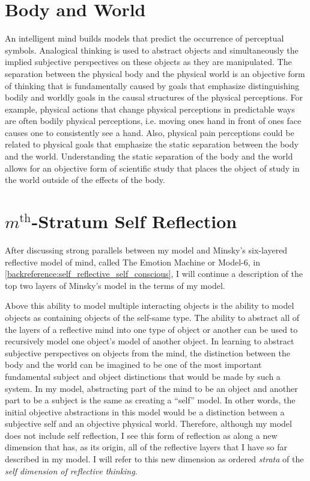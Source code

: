 \section{Body and World}

An intelligent mind builds models that predict the occurrence of
perceptual symbols.  Analogical thinking is used to abstract objects
and simultaneously the implied subjective perspectives on these
objects as they are manipulated.  The separation between the physical
body and the physical world is an objective form of thinking that is
fundamentally caused by goals that emphasize distinguishing bodily and
worldly goals in the causal structures of the physical perceptions.
For example, physical actions that change physical perceptions in
predictable ways are often bodily physical perceptions, i.e. moving
ones hand in front of ones face causes one to consistently see a hand.
Also, physical pain perceptions could be related to physical goals
that emphasize the static separation between the body and the world.
Understanding the static separation of the body and the world allows
for an objective form of scientific study that places the object of
study in the world outside of the effects of the body.

\section{$m^\text{th}$-Stratum Self Reflection}

\label{section:model_6_future_research}

After discussing strong parallels between my model and Minsky's
six-layered reflective model of mind, called The Emotion Machine or
Model-6, in \autoref{backreference:self_reflective_self_conscious}, I
will continue a description of the top two layers of Minsky's model in
the terms of my model.

Above this ability to model multiple interacting objects is the
ability to model objects as containing objects of the self-same type.
The ability to abstract all of the layers of a reflective mind into
one type of object or another can be used to recursively model one
object's model of another object.  In learning to abstract subjective
perspectives on objects from the mind, the distinction between the
body and the world can be imagined to be one of the most important
fundamental subject and object distinctions that would be made by such
a system.  In my model, abstracting part of the mind to be an object
and another part to be a subject is the same as creating a ``self''
model.  In other words, the initial objective abstractions in this
model would be a distinction between a subjective self and an
objective physical world.  Therefore, although my model does not
include self reflection, I see this form of reflection as along a new
dimension that has, as its origin, all of the reflective layers that I
have so far described in my model.  I will refer to this new dimension
as ordered \emph{strata} of the \emph{self dimension of reflective
  thinking}.

